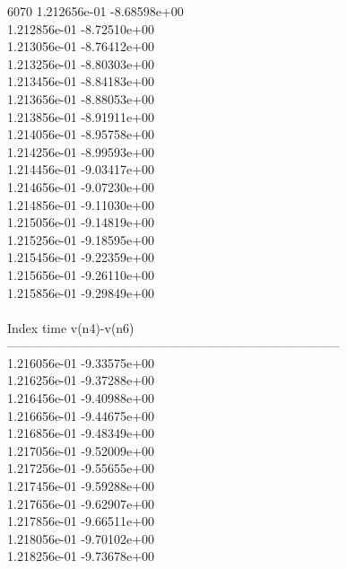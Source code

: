 6070	1.212656e-01	-8.68598e+00	\\ 	1.212856e-01	-8.72510e+00	\\ 	1.213056e-01	-8.76412e+00	\\ 	1.213256e-01	-8.80303e+00	\\ 	1.213456e-01	-8.84183e+00	\\ 	1.213656e-01	-8.88053e+00	\\ 	1.213856e-01	-8.91911e+00	\\ 	1.214056e-01	-8.95758e+00	\\ 	1.214256e-01	-8.99593e+00	\\ 	1.214456e-01	-9.03417e+00	\\ 	1.214656e-01	-9.07230e+00	\\ 	1.214856e-01	-9.11030e+00	\\ 	1.215056e-01	-9.14819e+00	\\ 	1.215256e-01	-9.18595e+00	\\ 	1.215456e-01	-9.22359e+00	\\ 	1.215656e-01	-9.26110e+00	\\ 	1.215856e-01	-9.29849e+00	\\ \hline
\\ \hline
Index   time            v(n4)-v(n6)     \\ \hline
--------------------------------------------------------------------------------\\ 	1.216056e-01	-9.33575e+00	\\ 	1.216256e-01	-9.37288e+00	\\ 	1.216456e-01	-9.40988e+00	\\ 	1.216656e-01	-9.44675e+00	\\ 	1.216856e-01	-9.48349e+00	\\ 	1.217056e-01	-9.52009e+00	\\ 	1.217256e-01	-9.55655e+00	\\ 	1.217456e-01	-9.59288e+00	\\ 	1.217656e-01	-9.62907e+00	\\ 	1.217856e-01	-9.66511e+00	\\ 	1.218056e-01	-9.70102e+00	\\ 	1.218256e-01	-9.73678e+00	\\ \hline
